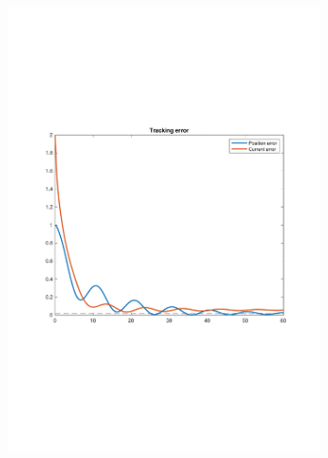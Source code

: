 \documentclass[a4paper, 12pt]{article}
\begin{document}
\begin{figure}[h!]{}
    \begin{subfigure}[t]{0.45\textwidth}
    \includegraphics[width=\textwidth]{Figures/scaled.pdf}
           \label{fig:scaled}
    \end{subfigure}
    \begin{subfigure}[t]{0.45\textwidth}

\end{subfigure}
\end{figure}
\end{document}
